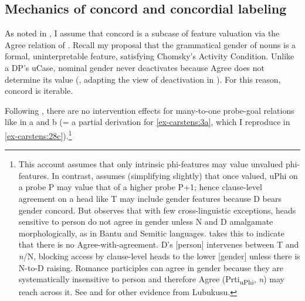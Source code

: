 \documentclass[output=paper
,modfonts
,nonflat]{langsci/langscibook}
\begin{document}
\subsection{Mechanics of concord and concordial labeling} \label{sec-carstens:3.2}
As noted in , I assume that concord is a subcase of feature valuation via the Agree relation of \citet{Chomsky2000, Chomsky2001}. Recall my proposal that the grammatical gender of nouns is a formal, uninterpretable feature, satisfying Chomsky's Activity Condition. Unlike a DP's uCase, nominal gender never deactivates because Agree does not determine its value (\citealt{Carstens2010, Carstens2011}, adapting the view of deactivation in \citealt{Nevins2005}). For this reason, concord is iterable.\largerpage

Following \citet{Hiraiwa2001}, there are no intervention effects for many-to-one probe-goal relations like in a and b (= a partial derivation for \ref{ex-carstens:3a}, which I reproduce in \ref{ex-carstens:28c}).{\footnote{\label{note13}This account assumes that only intrinsic phi-features may value unvalued phi-features. In contrast, \citet{Danon2011} assumes (simplifying slightly) that once valued, uPhi on a probe P may value that of a higher probe P+1; hence clause-level agreement on a head like T may include gender features because D bears gender concord. But \citet{Carstens2011} observes that with few cross-linguistic exceptions, heads sensitive to person do not agree in gender unless N and D amalgamate morphologically, as in Bantu and Semitic languages. \citet{Carstens2011} takes this to indicate that there is no Agree-with-agreement. D’s [person] intervenes between T and \textit{n}/N, blocking access by clause-level heads to the lower [gender] unless there is N-to-D raising. Romance participles can agree in gender because they are systematically insensitive to person and therefore Agree (Prti\textsubscript{uPhi}, \textit{n}) may reach across it. See \citealt{Carstens_Diercks2013} and \citealt{Wasike2007} for other evidence from Lubukusu.}}
\end{document}
